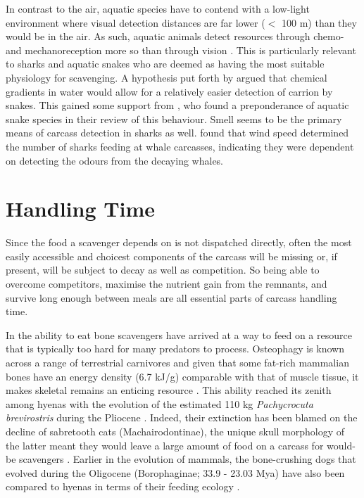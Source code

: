 \documentclass[a4paper,12pt]{article}
\begin{document}
In contrast to the air, aquatic species have to contend with a low-light environment where visual detection distances are far lower ($<$ 100 m) than they would be in the air.
As such, aquatic animals detect resources through chemo- and mechanoreception more so than through vision \citep{ruxton2004energetic}.
This is particularly relevant to sharks and aquatic snakes who are deemed as having the most suitable physiology for scavenging.
A hypothesis put forth by \cite{sazima1990necrofagia} argued that chemical gradients in water would allow for a relatively easier detection of carrion by snakes.
This gained some support from \cite{devault2002scavenging}, who found a preponderance of aquatic snake species in their review of this behaviour.
Smell seems to be the primary means of carcass detection in sharks as well. 
\cite{fallows2013white} found that wind speed determined the number of sharks feeding at whale carcasses, indicating they were dependent on detecting the odours from the decaying whales. 





\section*{Handling Time}
Since the food a scavenger depends on is not dispatched directly, often the most easily accessible and choicest components of the carcass will be missing or, if present, will be subject to decay as well as competition.
So being able to overcome competitors, maximise the nutrient gain from the remnants, and survive long enough between meals are all essential parts of carcass handling time. 

In the ability to eat bone scavengers have arrived at a way to feed on a resource that is typically too hard for many predators to process. 
Osteophagy is known across a range of terrestrial carnivores and given that some fat-rich mammalian bones have an energy density (6.7 kJ/g) comparable with that of muscle tissue, it makes skeletal remains an enticing resource \citep{brown1989study}.
This ability reached its zenith among hyenas with the evolution of the estimated 110 kg \textit{Pachycrocuta brevirostris} during the Pliocene \citep[3.6 - 2.58 Mya; ][]{palmqvist2011giant}.
Indeed, their extinction has been blamed on the decline of sabretooth cats (Machairodontinae), the unique skull morphology of the latter meant they would leave a large amount of food on a carcass for would-be scavengers \citep{palmqvist2011giant}. 
Earlier in the evolution of mammals, the bone-crushing dogs that evolved during the Oligocene (Borophaginae; 33.9 - 23.03 Mya) have also been compared to hyenas in terms of their feeding ecology \citep{van2003chapter,martin2016pursuit}.
\end{document}
